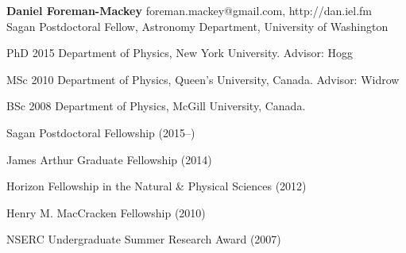 \documentclass[12pt,letterpaper]{article}
\begin{document}
\thispagestyle{empty}\sloppy\sloppypar\raggedbottom

\textbf{\Large Daniel Foreman-Mackey} \hfill
\textsf{\small foreman.mackey@gmail.com, http://dan.iel.fm} \\[0.5ex]
Sagan Postdoctoral Fellow, Astronomy Department, University of Washington\\[0.5ex]

\begin{list}{}{\cvlist}
\item
PhD 2015 Department of Physics, New York University. Advisor: Hogg
\item
MSc 2010 Department of Physics, Queen's University, Canada. Advisor: Widrow
\item
BSc 2008 Department of Physics, McGill University, Canada.
\end{list}

\begin{list}{}{\cvlist}

\item Sagan Postdoctoral Fellowship (2015--)
\item James Arthur Graduate Fellowship (2014)
\item Horizon Fellowship in the Natural \& Physical Sciences (2012)
\item Henry M. MacCracken Fellowship (2010)
\item NSERC Undergraduate Summer Research Award (2007)

\end{list}

\ifdefined\withpubs
    \begin{list}{}{\cvlist}
    
    \end{list}

    \begin{list}{}{\cvlist}
    
    \end{list}
\fi
\end{document}
